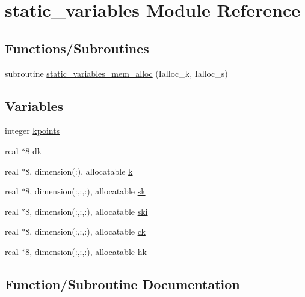 \hypertarget{namespacestatic__variables}{}\section{static\+\_\+variables Module Reference}
\label{namespacestatic__variables}
\subsection*{Functions/\+Subroutines}
\begin{DoxyCompactItemize}
\item 
subroutine \hyperlink{namespacestatic__variables_aef5303f4ff2e5ebc171fdf5fffccc541}{static\+\_\+variables\+\_\+mem\+\_\+alloc} (Ialloc\+\_\+k, Ialloc\+\_\+s)
\end{DoxyCompactItemize}
\subsection*{Variables}
\begin{DoxyCompactItemize}
\item 
integer \hyperlink{namespacestatic__variables_a5d1033bb9fdfdb069bcd5daa750990a6}{kpoints}
\item 
real $\ast$8 \hyperlink{namespacestatic__variables_afb565eaf0e52e61ffb6756641529ecfb}{dk}
\item 
real $\ast$8, dimension(\+:), allocatable \hyperlink{namespacestatic__variables_af88be19e58d424bcd134981f4ecd4e16}{k}
\item 
real $\ast$8, dimension(\+:,\+:,\+:), allocatable \hyperlink{namespacestatic__variables_acf88451b31cf225c9d75dfa81b578d13}{sk}
\item 
real $\ast$8, dimension(\+:,\+:,\+:), allocatable \hyperlink{namespacestatic__variables_a98bc21063e8e3c88bf50664c36f0b1d0}{ski}
\item 
real $\ast$8, dimension(\+:,\+:,\+:), allocatable \hyperlink{namespacestatic__variables_a3fdd9ce6668579419aca846701b9c6f8}{ck}
\item 
real $\ast$8, dimension(\+:,\+:,\+:), allocatable \hyperlink{namespacestatic__variables_a2a3637153de124a5886a991d54b44f25}{hk}
\end{DoxyCompactItemize}


\subsection{Function/\+Subroutine Documentation}
